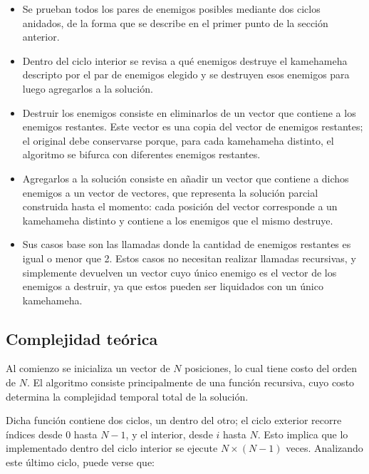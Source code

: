     \begin{itemize}
        \item Se prueban todos los pares de enemigos posibles mediante dos ciclos anidados, de la forma que se describe en el primer punto de la sección anterior.
        \item Dentro del ciclo interior se revisa a qué enemigos destruye el kamehameha descripto por el par de enemigos elegido y se destruyen esos enemigos para luego agregarlos a la solución.
        \item Destruir los enemigos consiste en eliminarlos de un vector que contiene a los enemigos restantes. Este vector es una copia del vector de enemigos restantes; el original debe conservarse porque, para cada kamehameha distinto, el algoritmo se bifurca con diferentes enemigos restantes.
        \item Agregarlos a la solución consiste en añadir un vector que contiene a dichos enemigos a un vector de vectores, que representa la solución parcial construida hasta el momento: cada posición del vector corresponde a un kamehameha distinto y contiene a los enemigos que el mismo destruye.
        \item Sus casos base son las llamadas donde la cantidad de enemigos restantes es igual o menor que 2. Estos casos no necesitan realizar llamadas recursivas, y simplemente devuelven un vector cuyo único enemigo es el vector de los enemigos a destruir, ya que estos pueden ser liquidados con un único kamehameha.
    \end{itemize}

    \subsection{Complejidad teórica}

    Al comienzo se inicializa un vector de $N$ posiciones, lo cual tiene costo del orden de $N$. El algoritmo consiste principalmente de una función recursiva, cuyo costo determina la complejidad temporal total de la solución.
    
    Dicha función contiene dos ciclos, un dentro del otro; el ciclo exterior recorre índices desde $0$ hasta $N - 1$, y el interior, desde $i$ hasta $N$. Esto implica que lo implementado dentro del ciclo interior se ejecute $N \times (N - 1)$ veces. Analizando este último ciclo, puede verse que:

